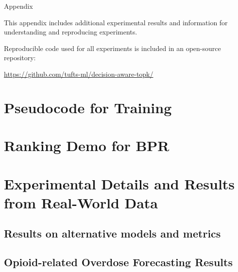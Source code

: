 \documentclass{article}
\begin{document}
\setcounter{table}{0}
\setcounter{figure}{0}
\setcounter{algorithm}{0}

\makeatletter 
\let\c@table\c@figure
\let\c@lstlisting\c@figure
\let\c@algorithm\c@figure
\makeatother


\begin{center}
{\large Appendix}
\end{center}
This appendix includes additional experimental results and information for understanding and reproducing experiments. 

Reproducible code used for all experiments is included in an open-source repository:

\url{https://github.com/tufts-ml/decision-aware-topk/}

\tableofcontents



\newpage

\section{Pseudocode for Training}



\section{Ranking Demo for BPR}
\label{supp:ranking_demo}



\section{Experimental Details and Results from Real-World Data}
\label{supp:real_data}


\subsection{Results on alternative models and metrics}
\label{supp:metrics_models}

\subsection{Opioid-related Overdose Forecasting Results}
\label{supp:results_opioids}

\end{document}
